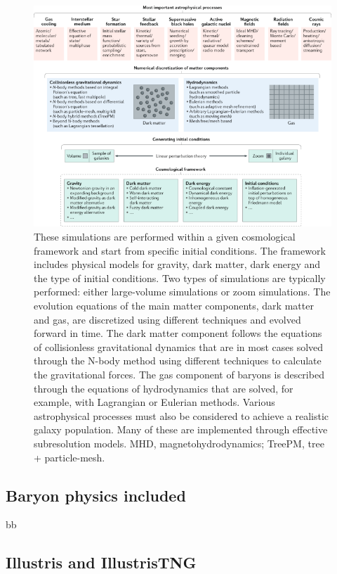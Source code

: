 \documentclass{book}
\begin{document}
\begin{figure}[!htb]
    \centering
    \includegraphics[width=0.8\linewidth]{img/sim-physics.png}
    \caption{These simulations are performed within a given
cosmological framework and start from specific initial conditions. The framework includes physical models for gravity,
dark matter, dark energy and the type of initial conditions. Two types of simulations are typically performed: either
large-volume simulations or zoom simulations. The evolution equations of the main matter components, dark matter
and gas, are discretized using different techniques and evolved forward in time. The dark matter component follows
the equations of collisionless gravitational dynamics that are in most cases solved through the N-body method using
different techniques to calculate the gravitational forces. The gas component of baryons is described through the
equations of hydrodynamics that are solved, for example, with Lagrangian or Eulerian methods. Various astrophysical
processes must also be considered to achieve a realistic galaxy population. Many of these are implemented through
effective subresolution models. MHD, magnetohydrodynamics; TreePM, tree + particle-mesh.}
    \label{fig:enter-label}
\end{figure}



\subsection{Baryon physics included}

bb


\subsection{Illustris and IllustrisTNG}
\end{document}
